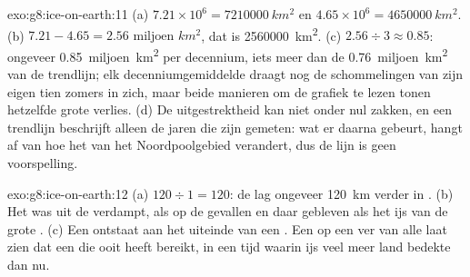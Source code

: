 \begin{solution}{exo:g8:ice-on-earth:11}
(a) $7.21 \times 10^6 = \qty{7210000}{km^2}$ en $4.65 \times 10^6 =
\qty{4650000}{km^2}$. (b) $7.21 - 4.65 = \num{2.56}\text{ miljoen }\unit{km^2}$, dat
is \qty{2560000}{km^2}. (c) $2.56 \div 3 \approx 0.85$: ongeveer
\num{0.85}~miljoen~\unit{km^2} per decennium, iets meer dan de
\num{0.76}~miljoen~\unit{km^2} van de trendlijn; elk decenniumgemiddelde
draagt nog de schommelingen van zijn eigen tien zomers in zich, maar beide
manieren om de grafiek te lezen tonen hetzelfde grote verlies. (d) De
uitgestrektheid kan niet onder nul zakken, en een trendlijn beschrijft
alleen de jaren die zijn gemeten: wat er daarna gebeurt, hangt af van hoe
het  van het Noordpoolgebied verandert, dus de lijn is geen
voorspelling.
\end{solution}

\begin{solution}{exo:g8:ice-on-earth:12}
(a) $120 \div 1 = 120$: de  lag ongeveer \qty{120}{km} verder in .
(b) Het was uit de  verdampt, als  op de  gevallen
en daar gebleven als het ijs van de grote . (c) Een 
ontstaat aan het uiteinde van een . Een  op een 
ver van alle  laat zien dat een  die  ooit heeft
bereikt, in een tijd waarin ijs veel meer land bedekte dan nu.
\end{solution}

